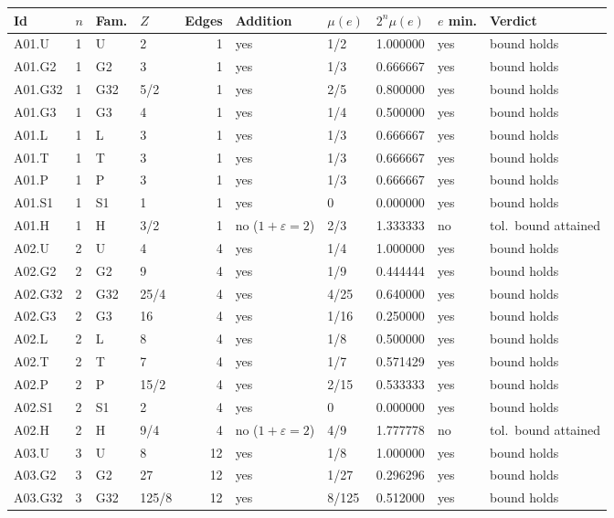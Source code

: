 {\scriptsize\setlength{\tabcolsep}{3pt}
\begin{longtable}{@{}llllrlllll@{}}
\toprule
Id & $n$ & Fam. & $Z$ & Edges & Addition & $\mu(e)$ & $2^n\mu(e)$ & $e$ min. & Verdict \\
\midrule\endhead
\bottomrule\endfoot
A01.U & 1 & U & 2 & 1 & yes & 1/2 & 1.000000 & yes & bound holds \\
A01.G2 & 1 & G2 & 3 & 1 & yes & 1/3 & 0.666667 & yes & bound holds \\
A01.G32 & 1 & G32 & 5/2 & 1 & yes & 2/5 & 0.800000 & yes & bound holds \\
A01.G3 & 1 & G3 & 4 & 1 & yes & 1/4 & 0.500000 & yes & bound holds \\
A01.L & 1 & L & 3 & 1 & yes & 1/3 & 0.666667 & yes & bound holds \\
A01.T & 1 & T & 3 & 1 & yes & 1/3 & 0.666667 & yes & bound holds \\
A01.P & 1 & P & 3 & 1 & yes & 1/3 & 0.666667 & yes & bound holds \\
A01.S1 & 1 & S1 & 1 & 1 & yes & 0 & 0.000000 & yes & bound holds \\
A01.H & 1 & H & 3/2 & 1 & no ($1{+}\varepsilon=2$) & 2/3 & 1.333333 & no & tol.\ bound attained \\
A02.U & 2 & U & 4 & 4 & yes & 1/4 & 1.000000 & yes & bound holds \\
A02.G2 & 2 & G2 & 9 & 4 & yes & 1/9 & 0.444444 & yes & bound holds \\
A02.G32 & 2 & G32 & 25/4 & 4 & yes & 4/25 & 0.640000 & yes & bound holds \\
A02.G3 & 2 & G3 & 16 & 4 & yes & 1/16 & 0.250000 & yes & bound holds \\
A02.L & 2 & L & 8 & 4 & yes & 1/8 & 0.500000 & yes & bound holds \\
A02.T & 2 & T & 7 & 4 & yes & 1/7 & 0.571429 & yes & bound holds \\
A02.P & 2 & P & 15/2 & 4 & yes & 2/15 & 0.533333 & yes & bound holds \\
A02.S1 & 2 & S1 & 2 & 4 & yes & 0 & 0.000000 & yes & bound holds \\
A02.H & 2 & H & 9/4 & 4 & no ($1{+}\varepsilon=2$) & 4/9 & 1.777778 & no & tol.\ bound attained \\
A03.U & 3 & U & 8 & 12 & yes & 1/8 & 1.000000 & yes & bound holds \\
A03.G2 & 3 & G2 & 27 & 12 & yes & 1/27 & 0.296296 & yes & bound holds \\
A03.G32 & 3 & G32 & 125/8 & 12 & yes & 8/125 & 0.512000 & yes & bound holds \\

\end{longtable}}
